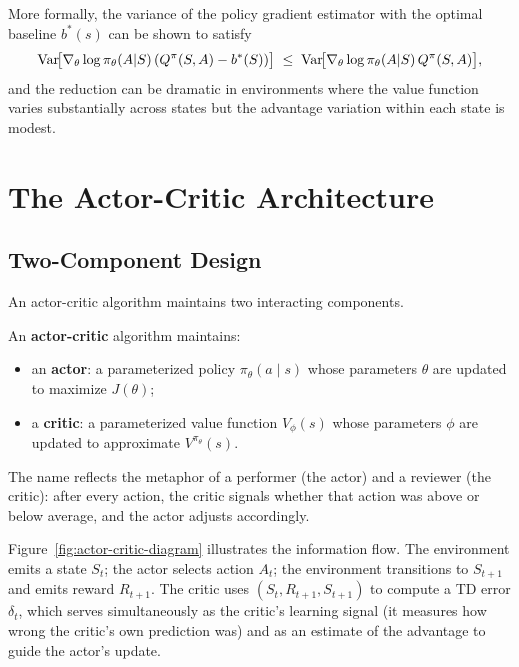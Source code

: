 More formally, the variance of the policy gradient estimator with the
optimal baseline $b^*(s)$ can be shown to satisfy
\begin{equation}
\label{eq:variance-reduction}
\operatorname{Var}\!\bigl[\nabla_\theta \log\pi_\theta(A|S)\,(Q^\pi(S,A) - b^*(S))\bigr]
\;\leq\;
\operatorname{Var}\!\bigl[\nabla_\theta \log\pi_\theta(A|S)\,Q^\pi(S,A)\bigr],
\end{equation}
and the reduction can be dramatic in environments where the value function
varies substantially across states but the advantage variation within each
state is modest.

\section{The Actor-Critic Architecture}
\label{sec:actor-critic-arch}

\subsection{Two-Component Design}

An actor-critic algorithm maintains two interacting components.

\begin{definition}
\label{def:actor-critic}
An \textbf{actor-critic} algorithm maintains:
\begin{itemize}[leftmargin=*]
  \item an \textbf{actor}: a parameterized policy $\pi_\theta(a \mid s)$ whose
    parameters $\theta$ are updated to maximize $J(\theta)$;
  \item a \textbf{critic}: a parameterized value function $V_\phi(s)$ whose
    parameters $\phi$ are updated to approximate $V^{\pi_\theta}(s)$.
\end{itemize}
\end{definition}

The name reflects the metaphor of a performer (the actor) and a reviewer
(the critic): after every action, the critic signals whether that action
was above or below average, and the actor adjusts accordingly.

Figure~\ref{fig:actor-critic-diagram} illustrates the information flow.
The environment emits a state $S_t$; the actor selects action $A_t$; the
environment transitions to $S_{t+1}$ and emits reward $R_{t+1}$.  The
critic uses $(S_t, R_{t+1}, S_{t+1})$ to compute a TD error $\delta_t$,
which serves simultaneously as the critic's learning signal (it measures
how wrong the critic's own prediction was) and as an estimate of the
advantage to guide the actor's update.


